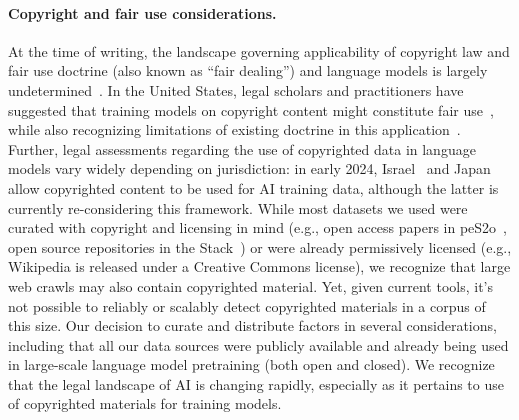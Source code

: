 \paragraph{Copyright and fair use considerations.} 
At the time of writing, the landscape governing applicability of copyright law and fair use doctrine (also known as ``fair dealing'') and language models is largely undetermined~\citep{Cooper2023GenerativeAILaw,Lee2023Talking}. 
In the United States, legal scholars and practitioners have suggested that training models on copyright content might constitute fair use~\citep{iSchoolUIUC2023,UCBerkeley2023,Henderson2023FoundationMA}, while also recognizing limitations of existing doctrine in this application~\citep{uspto-copyright-ai2}.
Further, legal assessments regarding the use of copyrighted data in language models vary widely depending on jurisdiction: 
in early 2024, Israel~\citep{Israel2022} and Japan~\citep{Technomancersai2023-rx} allow copyrighted content to be used for AI training data, although the latter is currently re-considering this framework.
While most datasets we used were curated with copyright and licensing in mind (e.g., open access papers in peS2o~\citep{peS2o}, open source repositories in the Stack~\citep{kocetkov2022stack}) or were already permissively licensed (e.g., Wikipedia is released under a Creative Commons license), we recognize that large web crawls may also contain copyrighted material. 
Yet, given current tools, it's not possible to reliably or scalably detect copyrighted materials in a corpus of this size.
Our decision to curate and distribute \dolma factors in several considerations, including that all our data sources were publicly available and already being used in large-scale language model pretraining (both open and closed). 
We recognize that the legal landscape of AI is changing rapidly, especially as it pertains to use of copyrighted materials for training models. 


